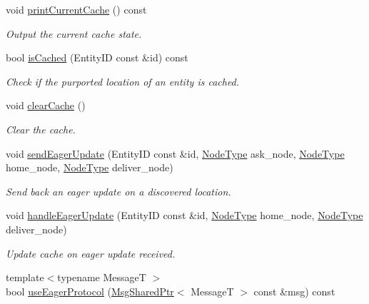 \begin{DoxyCompactItemize}
void \hyperlink{structvt_1_1location_1_1_entity_location_coord_a33f2bf9523cfc89fae0f1151fa2d87db}{print\+Current\+Cache} () const
\begin{DoxyCompactList}\small\item\em Output the current cache state. \end{DoxyCompactList}\item 
bool \hyperlink{structvt_1_1location_1_1_entity_location_coord_a9e6d5b9783f617f4e036ad9f7ba19953}{is\+Cached} (Entity\+ID const \&id) const
\begin{DoxyCompactList}\small\item\em Check if the purported location of an entity is cached. \end{DoxyCompactList}\item 
void \hyperlink{structvt_1_1location_1_1_entity_location_coord_ac20c510b73a5f6f753269b6d05b389aa}{clear\+Cache} ()
\begin{DoxyCompactList}\small\item\em Clear the cache. \end{DoxyCompactList}\item 
void \hyperlink{structvt_1_1location_1_1_entity_location_coord_a9903f0c4581b9d8a231293e98cf9a11c}{send\+Eager\+Update} (Entity\+ID const \&id, \hyperlink{namespacevt_a866da9d0efc19c0a1ce79e9e492f47e2}{Node\+Type} ask\+\_\+node, \hyperlink{namespacevt_a866da9d0efc19c0a1ce79e9e492f47e2}{Node\+Type} home\+\_\+node, \hyperlink{namespacevt_a866da9d0efc19c0a1ce79e9e492f47e2}{Node\+Type} deliver\+\_\+node)
\begin{DoxyCompactList}\small\item\em Send back an eager update on a discovered location. \end{DoxyCompactList}\item 
void \hyperlink{structvt_1_1location_1_1_entity_location_coord_a02337c5b5c23bf81b540568107103ef4}{handle\+Eager\+Update} (Entity\+ID const \&id, \hyperlink{namespacevt_a866da9d0efc19c0a1ce79e9e492f47e2}{Node\+Type} home\+\_\+node, \hyperlink{namespacevt_a866da9d0efc19c0a1ce79e9e492f47e2}{Node\+Type} deliver\+\_\+node)
\begin{DoxyCompactList}\small\item\em Update cache on eager update received. \end{DoxyCompactList}\item 
{\footnotesize template$<$typename MessageT $>$ }\\bool \hyperlink{structvt_1_1location_1_1_entity_location_coord_a482a031eb17aba77a9efd946fe3f033c}{use\+Eager\+Protocol} (\hyperlink{namespacevt_ab2b3d506ec8e8d1540aede826d84a239}{Msg\+Shared\+Ptr}$<$ MessageT $>$ const \&msg) const

\end{DoxyCompactItemize}
